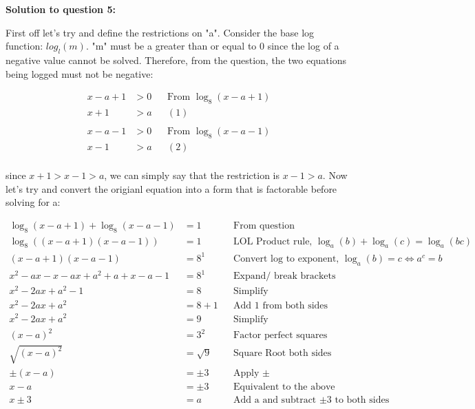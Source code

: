 \documentclass[12pt]{book}
\begin{document}
\begin{enumerate}
\vspace{0.1cm}
\textbf{Solution to question 5:}

First off let's try and define the restrictions on "a". Consider the base 
log function: $log_l(m)$. "m" must be a greater than or equal to 0 since the 
log of a negative value cannot be solved. Therefore, from the question, the two 
equations being logged must not be negative:

\begin{align*}
    x - a + 1 &> 0 && \text{From } \log_8(x-a+1) \\
    x + 1 &> a && (1)\\
\end{align*}
\vspace{-1cm}
\begin{align*}
    x - a - 1 &> 0 && \text{From } \log_8(x-a-1) \\
    x - 1 &> a && (2)\\
\end{align*}

since $x+1 > x-1 > a$, we can simply say that the restriction is $x-1 > a$. 
Now let's try and convert the origianl equation into a form that is factorable 
before solving for a:

\begin{align*}
    \log_8(x-a+1) + \log_8(x-a-1) &= 1 && \text{From question} \\
    \log_8((x-a+1)(x-a-1)) &= 1 && \text{LOL Product rule, } \log_a(b) + \log_a(c) = \log_a(bc) \\
    (x-a+1)(x-a-1) &= 8^1 && \text{Convert log to exponent, } \log_a(b) = c \Longleftrightarrow a^c = b \\
    x^2-ax-x-ax+a^2+a+x-a-1 &= 8^1 && \text{Expand/ break brackets} \\
    x^2-2ax+a^2-1 &= 8 && \text{Simplify} \\
    x^2-2ax+a^2 &= 8+1 && \text{Add 1 from both sides} \\
    x^2-2ax+a^2 &= 9 && \text{Simplify} \\
    (x-a)^2 &= 3^2 && \text{Factor perfect squares} \\
    \sqrt{(x-a)^2} &= \sqrt{9} && \text{Square Root both sides} \\
    \pm (x-a) &= \pm 3 && \text{Apply } \pm \\
    x-a &= \pm 3 && \text{Equivalent to the above} \\
    x\pm 3 &= a && \text{Add a and subtract } \pm \text{3 to both sides} \\
\end{align*}


\end{enumerate}
\end{document}
